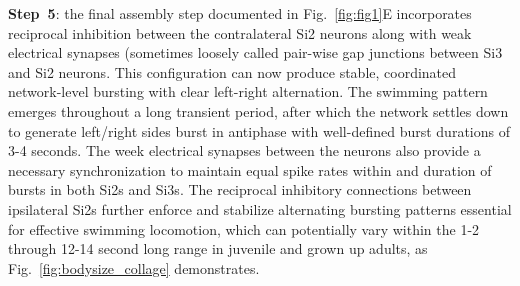 \documentclass[nofootinbib,aip,amsmath,amssymb,reprint,twocolumn,10pt]{revtex4-2}
\begin{document}
{\bf Step~5}: the final assembly step documented in Fig.~\ref{fig:fig1}E incorporates reciprocal inhibition between the contralateral Si2 neurons along with weak electrical synapses (sometimes loosely called pair-wise gap junctions between Si3 and Si2 neurons. This configuration can now produce stable, coordinated network-level bursting with clear left-right alternation. The swimming pattern emerges throughout a long transient period, after which the network settles down to generate left/right sides burst in antiphase with well-defined burst durations of 3-4 seconds. The week electrical synapses  between the neurons also provide a necessary synchronization to maintain equal spike rates within and duration of bursts in both Si2s and Si3s. The reciprocal inhibitory connections between ipsilateral Si2s further enforce and stabilize alternating bursting patterns essential for effective swimming locomotion, which can potentially vary within the 1-2 through 12-14 second long range in juvenile and grown up adults, as Fig.~\ref{fig:bodysize_collage} demonstrates.
\end{document}
